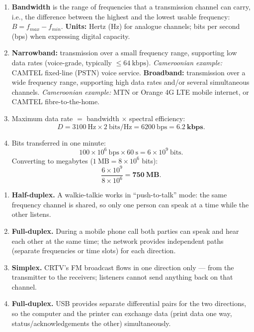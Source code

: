\documentclass[11pt]{article}
\begin{document}
\begin{corrige}
\begin{enumerate}
\item \textbf{Bandwidth} is the range of frequencies that a transmission channel can carry, i.e., the difference between the highest and the lowest usable frequency: $B = f_{max} - f_{min}$. \textbf{Units:} Hertz (Hz) for analogue channels; bits per second (bps) when expressing digital capacity.
\item \textbf{Narrowband:} transmission over a small frequency range, supporting low data rates (voice-grade, typically $\le 64\ \mathrm{kbps}$). \emph{Cameroonian example:} CAMTEL fixed-line (PSTN) voice service. \textbf{Broadband:} transmission over a wide frequency range, supporting high data rates and/or several simultaneous channels. \emph{Cameroonian example:} MTN or Orange 4G LTE mobile internet, or CAMTEL fibre-to-the-home.
\item Maximum data rate $=$ bandwidth $\times$ spectral efficiency:
\[ D = 3100\ \mathrm{Hz} \times 2\ \mathrm{bits/Hz} = 6200\ \mathrm{bps} = \mathbf{6.2\ kbps}. \]
\item Bits transferred in one minute:
\[ 100 \times 10^{6}\ \mathrm{bps} \times 60\ \mathrm{s} = 6 \times 10^{9}\ \mathrm{bits}. \]
Converting to megabytes ($1\ \mathrm{MB} = 8 \times 10^{6}$ bits):
\[ \frac{6 \times 10^{9}}{8 \times 10^{6}} = \mathbf{750\ MB}. \]
\end{enumerate}
\end{corrige}

\begin{corrige}
\begin{enumerate}
\item \textbf{Half-duplex.} A walkie-talkie works in ``push-to-talk'' mode: the same frequency channel is shared, so only one person can speak at a time while the other listens.
\item \textbf{Full-duplex.} During a mobile phone call both parties can speak and hear each other at the same time; the network provides independent paths (separate frequencies or time slots) for each direction.
\item \textbf{Simplex.} CRTV's FM broadcast flows in one direction only — from the transmitter to the receivers; listeners cannot send anything back on that channel.
\item \textbf{Full-duplex.} USB provides separate differential pairs for the two directions, so the computer and the printer can exchange data (print data one way, status/acknowledgements the other) simultaneously.
\end{enumerate}
\end{corrige}
\end{document}

